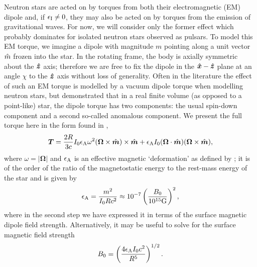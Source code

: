 \documentclass[../full_thesis/full_thesis.tex]{subfiles}
\begin{document}
Neutron stars are acted on by torques from both their electromagnetic (EM)
dipole and, if $\epsilon_{\mathrm{I}} \ne 0$, they may also be acted on by torques from the
emission of gravitational waves. For now, we will consider only the former
effect which probably dominates for isolated neutron stars observed as pulsars.
To model this EM torque, we imagine a dipole with magnitude $m$ pointing along
a unit vector $\hat{m}$ frozen into the star. In the rotating frame, the body is
axially symmetric about the $\boldsymbol{\hat{z}}$ axis; therefore we are free to fix the dipole
in the $\boldsymbol{\hat{x}}-\boldsymbol{\hat{z}}$ plane at an angle $\chi$ to the $\boldsymbol{\hat{z}}$ axis without loss of
generality. Often in the literature the effect of such an EM torque is modelled
by a vacuum dipole torque when modelling neutron stars, but \citet{Deutsch1955}
demonstrated that in a real finite volume (as opposed to a point-like) star,
the dipole torque has two components: the usual spin-down component and a
second so-called anomalous component. We present the full torque here in the
form found in \citet{Goldreich1970},
\begin{equation}
\boldsymbol{T}=\frac{2R}{3c} I_{0}\epsilon_{\mathrm{A}}\omega^{2}
               (\mathbf{\Omega} \times \hat{\boldsymbol{m}})\times \hat{\boldsymbol{m}}
               + \epsilon_{\mathrm{A}} I_{0}(\mathbf{\Omega} \cdot \hat{\boldsymbol{m}})
               (\mathbf{\Omega} \times \hat{\boldsymbol{m}}),
\label{eqn: torque}
\end{equation}
where $\omega=|\mathbf{\Omega}|$ and $\epsilon_{\mathrm{A}}$ is an effective magnetic
`deformation' as defined by \citet{Glampedakis2010}; it is of the order of
the ratio of the magnetostatic energy to the rest-mass energy of the star and
is given by
\begin{align}
\epsilon_{\mathrm{A}} = \frac{m^{2}}{I_{0}R c^{2}} \approx 10^{-7} \left(\frac{B_0}{10^{15}\textrm G}\right)^{2},
\end{align}
where in the second step we have expressed it in terms of the surface magnetic
dipole field strength. Alternatively, it may be useful to solve for the surface
magnetic field strength
\begin{equation}
    B_{0} = \left(\frac{4 \epsilon_{\mathrm{A}} I_{0} c^{2}}{R^{5}}\right)^{1/2}.
    \label{eqn: magnetic field epsA}
\end{equation}
\end{document}
